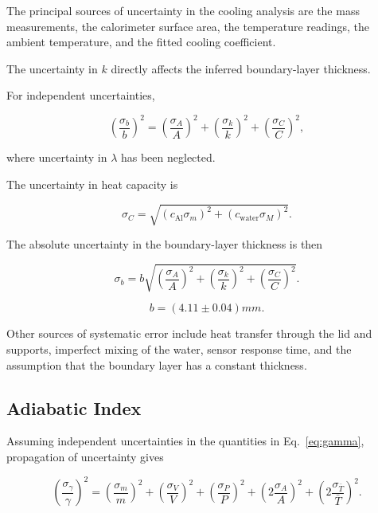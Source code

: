 \documentclass[12pt,a4paper]{article}
\begin{document}
The principal sources of uncertainty in the cooling analysis are
the mass measurements, the calorimeter surface area, the
temperature readings, the ambient temperature, and the fitted
cooling coefficient.

The uncertainty in $k$ directly affects the inferred boundary-layer
thickness.

For independent uncertainties,

\begin{equation}
    \left(\frac{\sigma_b}{b}\right)^2
    =
    \left(\frac{\sigma_A}{A}\right)^2+
    \left(\frac{\sigma_k}{k}\right)^2+
    \left(\frac{\sigma_C}{C}\right)^2,
\end{equation}

where uncertainty in $\lambda$ has been neglected.

The uncertainty in heat capacity is

\begin{equation}
    \sigma_C=
    \sqrt{
    (c_{\mathrm{Al}}\sigma_m)^2+
    (c_{\mathrm{water}}\sigma_M)^2
    }.
\end{equation}

The absolute uncertainty in the boundary-layer thickness is then

\begin{equation}
    \boxed{
    \sigma_b=b
    \sqrt{
    \left(\frac{\sigma_A}{A}\right)^2+
    \left(\frac{\sigma_k}{k}\right)^2+
    \left(\frac{\sigma_C}{C}\right)^2
    }
    }.
\end{equation}

\begin{equation*}
    \boxed{b=(4.11 \pm 0.04) \si{mm}}.
\end{equation*}

Other sources of systematic error include heat transfer through
the lid and supports, imperfect mixing of the water, sensor
response time, and the assumption that the boundary layer has
a constant thickness.

\subsection{Adiabatic Index}

Assuming independent uncertainties in the quantities in
Eq.~\eqref{eq:gamma}, propagation of uncertainty gives

\begin{equation}
    \left(\frac{\sigma_\gamma}{\gamma}\right)^2
    =
    \left(\frac{\sigma_m}{m}\right)^2+
    \left(\frac{\sigma_V}{V}\right)^2+
    \left(\frac{\sigma_P}{P}\right)^2+
    \left(2\frac{\sigma_A}{A}\right)^2+
    \left(2\frac{\sigma_{\bar{T}}}{\bar{T}}\right)^2.
\end{equation}
\end{document}
